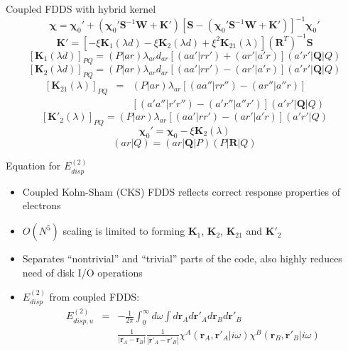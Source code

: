 \documentclass{beamer}
\begin{document}
        \begin{frame}{Coupled FDDS with hybrid kernel}
            $$\boldsymbol{\chi} = \boldsymbol{\chi}_0' + \left( \boldsymbol{\chi}_0' \mathbf{S}^{-1} \mathbf{W} + \mathbf{K}' \right) \left[ \mathbf{S} - \left( \boldsymbol{\chi}_0' \mathbf{S}^{-1} \mathbf{W} + \mathbf{K}' \right) \right]^{-1} \boldsymbol{\chi}_0'$$
            $$\mathbf{K}' = \left[ - \xi \mathbf{K}_1 \left( \lambda d\right) - \xi \mathbf{K}_2 \left( \lambda d\right) + \xi^2 \mathbf{K}_{21} \left( \lambda \right) \right] \left( \mathbf{R}^T \right)^{-1} \mathbf{S}$$
            $$[\mathbf{K}_1 (\lambda d)]_{PQ} = (P|ar) \lambda_{ar} d_{ar} [(aa'|rr')+(ar'|a'r)] (a'r'|\mathbf{Q}|Q)$$
            $$[\mathbf{K}_2 (\lambda d)]_{PQ} = (P|ar) \lambda_{ar} d_{ar} [(aa'|rr')-(ar'|a'r)] (a'r'|\mathbf{Q}|Q)$$
            \begin{eqnarray}
                \nonumber
                [\mathbf{K}_{21} (\lambda)]_{PQ} &=& (P|ar) \lambda_{ar} [(aa''|rr'')-(ar''|a''r)] \\ \nonumber
                & & [(a'a''|r'r'')-(a'r''|a''r')] (a'r'|\mathbf{Q}|Q)
            \end{eqnarray}
            $$[\mathbf{K}'_2 (\lambda)]_{PQ} = (P|ar) \lambda_{ar} [(aa'|rr')-(ar'|a'r)] (a'r'|Q)$$
            $$\boldsymbol{\chi}_0' = \boldsymbol{\chi}_0 - \xi \mathbf{K}_2 \left( \lambda \right)$$
            $$(ar|Q) = (ar|\mathbf{Q}|P)(P|\mathbf{R}|Q)$$
        \end{frame}

        \begin{frame}{Equation for $E_{disp}^{(2)}$}
            \begin{itemize}
                \item Coupled Kohn-Sham (CKS) FDDS reflects correct response properties of electrons
                \item $O(N^5)$ scaling is limited to forming  $\mathbf{K}_1$, $\mathbf{K}_2$, $\mathbf{K}_{21}$ and $\mathbf{K}'_2$
                \item Separates ``nontrivial'' and ``trivial'' parts of the code, also highly reduces need of disk I/O operations
                \item $E_{disp}^{(2)}$ from coupled FDDS:
                \begin{eqnarray}
                    \nonumber
                    E_{disp,u}^{(2)} &=& -\frac{1}{2\pi}\int_0^\infty d\omega \int d\mathbf{r}_A d\mathbf{r}'_A d\mathbf{r}_B d\mathbf{r}'_B \\ \nonumber
                    & & \frac{1}{|\mathbf{r}_A-\mathbf{r}_B|} \frac{1}{|\mathbf{r}'_A-\mathbf{r}'_B|} \chi^A\left(\mathbf{r}_A,\mathbf{r}'_A|i\omega\right)\chi^B\left(\mathbf{r}_B,\mathbf{r}'_B|i\omega\right)
                \end{eqnarray}
            \end{itemize}
        \end{frame}
        
\end{document}
